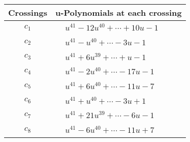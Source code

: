 \documentclass[1p]{elsarticle_modified}
\theoremstyle{definition}
\begin{document}
\begin{tabular}{m{50pt}|m{274pt}}
Crossings & \hspace{64pt}u-Polynomials at each crossing \\
\hline $$\begin{aligned}c_{1}\end{aligned}$$&$\begin{aligned}
&u^{41}-12 u^{40}+\cdots+10 u-1
\end{aligned}$\\
\hline $$\begin{aligned}c_{2}\end{aligned}$$&$\begin{aligned}
&u^{41}- u^{40}+\cdots-3 u-1
\end{aligned}$\\
\hline $$\begin{aligned}c_{3}\end{aligned}$$&$\begin{aligned}
&u^{41}+6 u^{39}+\cdots+u-1
\end{aligned}$\\
\hline $$\begin{aligned}c_{4}\end{aligned}$$&$\begin{aligned}
&u^{41}-2 u^{40}+\cdots-17 u-1
\end{aligned}$\\
\hline $$\begin{aligned}c_{5}\end{aligned}$$&$\begin{aligned}
&u^{41}+6 u^{40}+\cdots-11 u-7
\end{aligned}$\\
\hline $$\begin{aligned}c_{6}\end{aligned}$$&$\begin{aligned}
&u^{41}+u^{40}+\cdots-3 u+1
\end{aligned}$\\
\hline $$\begin{aligned}c_{7}\end{aligned}$$&$\begin{aligned}
&u^{41}+21 u^{39}+\cdots-6 u-1
\end{aligned}$\\
\hline $$\begin{aligned}c_{8}\end{aligned}$$&$\begin{aligned}
&u^{41}-6 u^{40}+\cdots-11 u+7
\end{aligned}$\\

\end{tabular}
\end{document}

